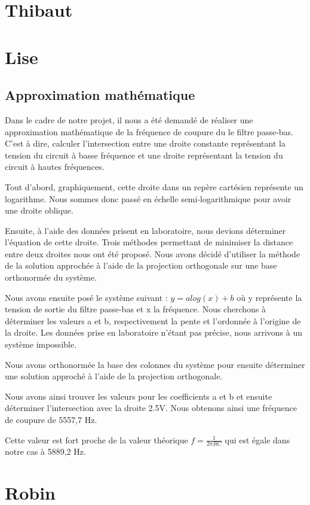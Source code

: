 \documentclass{article}
\begin{document}
\section{Thibaut}

\section{Lise}
\subsection{Approximation mathématique}

Dans le cadre de notre projet, il nous a été demandé de réaliser une approximation mathématique de la fréquence de coupure
du le filtre passe-bas. C'est à dire, calculer l'intersection entre une droite constante représentant la tension du circuit à basse fréquence et une droite représentant la tension du circuit à hautes fréquences. 

Tout d'abord, graphiquement, cette droite dans un repère cartésien représente un logarithme. Nous sommes donc passé en échelle semi-logarithmique pour avoir une droite oblique.

Ensuite, à l'aide des données prisent en laboratoire, nous devions déterminer l'équation de cette droite. Trois méthodes permettant de minimiser la distance entre deux droites nous ont été proposé. Nous avons décidé d'utiliser
la méthode de la solution approchée à l'aide de la projection orthogonale sur une base orthonormée du système. 

Nous avons ensuite posé le système suivant : $y = a log(x) + b$ où y représente la tension de sortie du filtre passe-bas et x la fréquence. Nous cherchons à déterminer les valeurs a et b, 
respectivement la pente et l'ordonnée à l'origine de la droite. Les données prise en laboratoire n'étant pas précise, nous arrivons à un système impossible. 

Nous avons orthonormée la base des colonnes du système pour ensuite  déterminer une solution approché à l'aide de la projection orthogonale. 

Nous avons ainsi trouver les valeurs pour les coefficients a et b et ensuite déterminer l'intersection avec la droite 2.5V.
Nous obtenons ainsi une fréquence de coupure de 5557,7 Hz. 

Cette valeur est fort proche de la valeur théorique $f = \frac{1}{2\pi RC}$ qui est égale dans notre cas à 5889,2 Hz.

\section{Robin}
\end{document}
